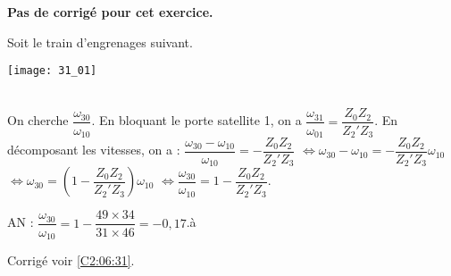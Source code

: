 \normaltrue \difficilefalse \tdifficilefalse
\correctiontrue


\setcounter{question}{0}
\ifcorrection
\else
\textbf{Pas de corrigé pour cet exercice.}
\fi

\ifprof
\else
Soit le train d'engrenages suivant. 
\begin{center}
\texttt{[image: 31\_01]}
\end{center}
\fi


\ifprof
\else
\fi

\ifprof ~\\
On cherche $\dfrac{\omega_{30}}{\omega_{10}}$. En bloquant le porte satellite 1, on a  
$\dfrac{\omega_{31}}{\omega_{01}}=\dfrac{Z_0 Z_2 }{Z_2' Z_3}$. En décomposant les vitesses, on a :
$\dfrac{\omega_{30}-\omega_{10}}{\omega_{10}}=-\dfrac{Z_0 Z_2 }{Z_2' Z_3}$
$\Leftrightarrow \omega_{30}-\omega_{10}=-\dfrac{Z_0 Z_2 }{Z_2' Z_3}\omega_{10}$
$\Leftrightarrow \omega_{30}=\left(1-\dfrac{Z_0 Z_2 }{Z_2' Z_3}\right)\omega_{10}$
$\Leftrightarrow \dfrac{\omega_{30}}{\omega_{10}}=1-\dfrac{Z_0 Z_2 }{Z_2' Z_3}$.

AN : $ \dfrac{\omega_{30}}{\omega_{10}}=1-\dfrac{49 \times 34}{31 \times 46}=-0,17$.à
\else
\fi


\ifprof
\else
\begin{flushright}
\footnotesize{Corrigé  voir \ref{C2:06:31}.}
\end{flushright}%
\fi